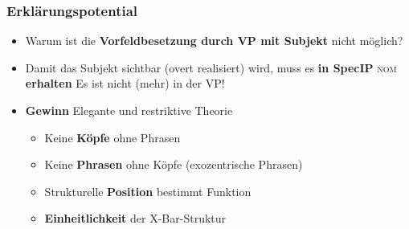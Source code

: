 \begin{frame}
\frametitle{Erklärungspotential}


\begin{itemize}
	\item Warum ist die \textbf{Vorfeldbesetzung durch VP mit Subjekt} nicht möglich?
	\eal 
	\zl

\pause
	\item Damit das Subjekt sichtbar (overt realisiert) wird, muss es \textbf{in SpecIP} \textsc{nom} \textbf{erhalten} \ras Es ist nicht (mehr) in der VP!

\end{itemize}		

\pause
\begin{itemize}
	\item \textbf{Gewinn} \ras Elegante und restriktive Theorie \nocite{Haspelmath94a}

	\begin{itemize}
		\item Keine \textbf{Köpfe} ohne Phrasen
		\item Keine \textbf{Phrasen} ohne Köpfe (exozentrische Phrasen)
		\item Strukturelle \textbf{Position} bestimmt Funktion
		\item \textbf{Einheitlichkeit} der X-Bar-Struktur
	\end{itemize}		

\end{itemize}

\end{frame}


